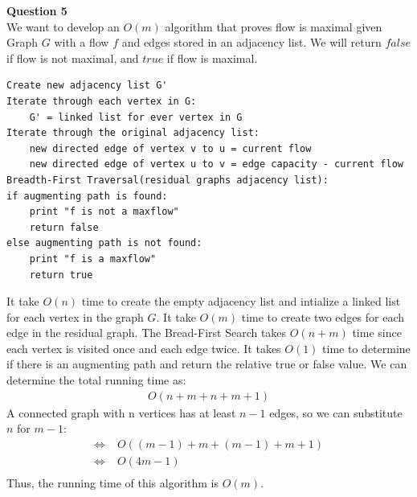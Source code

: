 \documentclass{article}
\begin{document}
\bigskip
{\bf Question 5}\\
We want to develop an $O(m)$ algorithm that proves flow is maximal given Graph $G$ with a flow $f$ and edges stored in an adjacency list. We will return $false$ if flow is not maximal, and $true$ if flow is maximal.
\begin{lstlisting}
Create new adjacency list G'
Iterate through each vertex in G:
    G' = linked list for ever vertex in G
Iterate through the original adjacency list:
    new directed edge of vertex v to u = current flow
    new directed edge of vertex u to v = edge capacity - current flow
Breadth-First Traversal(residual graphs adjacency list):
if augmenting path is found:
    print "f is not a maxflow"
    return false
else augmenting path is not found:
    print "f is a maxflow"
    return true
\end{lstlisting}

It take $O(n)$ time to create the empty adjacency list and intialize a linked list for each vertex in the graph $G$. It take $O(m)$ time to create two edges for each edge in the residual graph. The Bread-First Search takes $O(n+m)$ time since each vertex is visited once and each edge twice. It takes $O(1)$ time to determine if there is an augmenting path and return the relative true or false value. We can determine the total running time as:
\begin{equation*} 
\begin{split}
O(n + m + n + m + 1)
\end{split}
\end{equation*}
A connected graph with n vertices has at least $n-1$ edges, so we can substitute $n$ for $m-1$:
\begin{equation*} 
\begin{split}
\Leftrightarrow \; & O((m-1) + m + (m-1) + m + 1)\\
\Leftrightarrow \; & O(4m-1)\\
\end{split}
\end{equation*}
Thus, the running time of this algorithm is $O(m)$.
\end{document}
